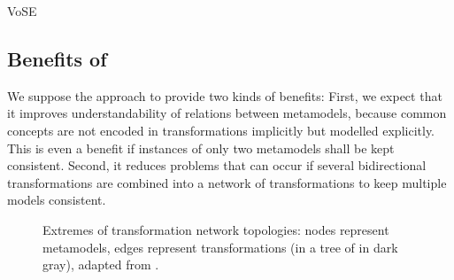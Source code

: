 \begin{copiedFrom}{VoSE}
\subsection{Benefits of \commonalities}
\label{sec:approach:benefits}

We suppose the \commonalities approach to provide two kinds of benefits:
First, we expect that it improves understandability of relations between metamodels, because common concepts are not encoded in transformations implicitly but modelled explicitly.
This is even a benefit if instances of only two metamodels shall be kept consistent.
Second, it reduces problems that can occur if several bidirectional transformations are combined into a network of transformations to keep multiple models consistent.


\begin{figure}
    \centering
    \begin{minipage}[b]{0.4\columnwidth}
        \centering
        
        \vspace{-1em}
        \label{fig:quality:topologies:full}
    \end{minipage}
    \hspace{2em}
    \begin{minipage}[b]{0.4\columnwidth}
        \centering
        
        \label{fig:quality:topologies:tree}
    \end{minipage}
    \caption[Extremes of transformation network topologies]{Extremes of transformation network topologies: nodes represent metamodels, edges represent transformations (\conceptmetamodels in a tree of \commonalities in dark gray), adapted from \cite{klare2018docsym}.}
    \label{fig:quality:topologies}
\end{figure}


\end{copiedFrom}
